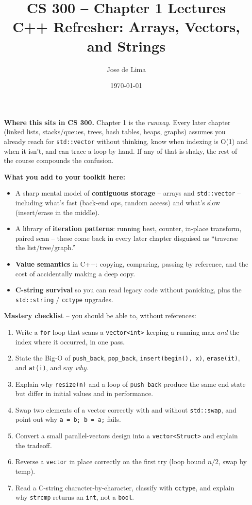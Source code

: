 \documentclass[11pt]{article}
\title{CS 300 -- Chapter 1 Lectures\\\large C++ Refresher: Arrays, Vectors, and Strings}
\author{Jose de Lima}
\date{\today}
\begin{document}
\maketitle

\begin{ideabox}
\textbf{Where this sits in CS 300.} Chapter 1 is the \emph{runway}. Every
later chapter (linked lists, stacks/queues, trees, hash tables, heaps, graphs)
assumes you already reach for \texttt{std::vector} without thinking, know
when indexing is O(1) and when it isn't, and can trace a loop by hand. If
any of that is shaky, the rest of the course compounds the confusion.

\textbf{What you add to your toolkit here:}
\begin{itemize}
    \item A sharp mental model of \textbf{contiguous storage} -- arrays and
          \texttt{std::vector} -- including what's fast (back-end ops, random
          access) and what's slow (insert/erase in the middle).
    \item A library of \textbf{iteration patterns}: running best, counter,
          in-place transform, paired scan -- these come back in every later
          chapter disguised as ``traverse the list/tree/graph.''
    \item \textbf{Value semantics} in C++: copying, comparing, passing by
          reference, and the cost of accidentally making a deep copy.
    \item \textbf{C-string survival} so you can read legacy code without
          panicking, plus the \texttt{std::string} / \texttt{cctype} upgrades.
\end{itemize}

\textbf{Mastery checklist} -- you should be able to, without references:
\begin{enumerate}
    \item Write a \texttt{for} loop that scans a \texttt{vector<int>} keeping a
          running max \emph{and} the index where it occurred, in one pass.
    \item State the Big-O of \texttt{push\_back}, \texttt{pop\_back},
          \texttt{insert(begin(), x)}, \texttt{erase(it)}, and \texttt{at(i)},
          and say \emph{why}.
    \item Explain why \texttt{resize(n)} and a loop of \texttt{push\_back}
          produce the same end state but differ in initial values and in
          performance.
    \item Swap two elements of a vector correctly with and without
          \texttt{std::swap}, and point out why \texttt{a = b;\ b = a;} fails.
    \item Convert a small parallel-vectors design into a
          \texttt{vector<Struct>} and explain the tradeoff.
    \item Reverse a \texttt{vector} in place correctly on the first try
          (loop bound $n/2$, swap by temp).
    \item Read a C-string character-by-character, classify with
          \texttt{cctype}, and explain why \texttt{strcmp} returns an
          \texttt{int}, not a \texttt{bool}.
\end{enumerate}


\end{ideabox}
\end{document}
